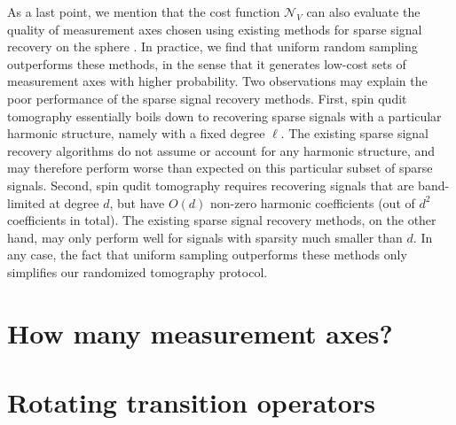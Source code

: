 \documentclass[notitlepage,twocolumn]{revtex4-2}
\newcommand{\1}{\mathds{1}}
\newcommand{\N}{\mathcal{N}}
\begin{document}
As a last point, we mention that the cost function $\N_V$ can also evaluate the quality of measurement axes chosen using existing methods for sparse signal recovery on the sphere \cite{rauhut2011sparse, alem2012sparse}.
In practice, we find that uniform random sampling outperforms these methods, in the sense that it generates low-cost sets of measurement axes with higher probability.
Two observations may explain the poor performance of the sparse signal recovery methods.
First, spin qudit tomography essentially boils down to recovering sparse signals with a particular harmonic structure, namely with a fixed degree $\ell$.
The existing sparse signal recovery algorithms do not assume or account for any harmonic structure, and may therefore perform worse than expected on this particular subset of sparse signals.
Second, spin qudit tomography requires recovering signals that are band-limited at degree $d$, but have $O(d)$ non-zero harmonic coefficients (out of $d^2$ coefficients in total).
The existing sparse signal recovery methods, on the other hand, may only perform well for signals with sparsity much smaller than $d$.
In any case, the fact that uniform sampling outperforms these methods only simplifies our randomized tomography protocol.

\section{How many measurement axes?}
\label{sec:axes}




\onecolumngrid
\appendix

\section{Rotating transition operators}
\label{sec:rotations}
\end{document}
